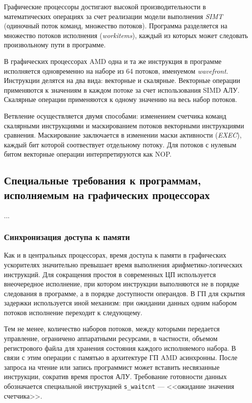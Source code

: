\documentclass[a4paper,14pt]{extarticle}
\begin{document}
Графические процессоры достигают высокой производительности в математических операциях
за счет реализации модели выполнения \textit{SIMT} (одиночный поток команд, множество потоков).
Программа разделяется на множество потоков исполнения (\textit{workitems}),
каждый из которых может следовать произвольному пути в программе.

В графических процессорах AMD одна и та же инструкция в программе исполняется одновременно
на наборе из 64 потоков, именуемом \textit{wavefront}. Инструкции делятся на два вида:
векторные и скалярные. Векторные операции применяются к значениям в каждом потоке
за счет использования SIMD АЛУ. Скалярные операции применяются к одному значению на весь набор
потоков.

Ветвление осуществляется двумя способами: изменением счетчика команд скалярными инструкциями
и маскированием потоков векторными инструкциями сравнения. Маскирование заключается в изменении
маски активности (\textit{EXEC}), каждый бит которой соотвествует отдельному потоку.
Для потоков с нулевым битом векторные операции интерпретируются как NOP.

\subsection{Специальные требования к программам, исполняемым на графических процессорах}

...

\subsubsection{Синхронизация доступа к памяти}

Как и в центральных процессорах, время доступа к памяти в графических ускорителях
значительно превышает время выполнения арифметико-логических инструкций.
Для сокращения простоя в современных ЦП используется внеочередное исполнение, при котором
инструкции выполняются не в порядке следования в программе, а в порядке доступности операндов.
В ГП для скрытия задержки используется иной механизм: при ожидании данных одним набором
потоков исполнение переходит к следующему.

Тем не менее, количество наборов потоков, между которыми передается управление, ограничено
аппаратными ресурсами, в частности, объемом регистрового файла для хранения состояния каждого
исполняемого набора. В связи с этим операции с памятью в архитектуре ГП AMD асинхронны.
После запроса на чтение или запись программист может вставить несвязанные инструкции,
сократив время простоя АЛУ. Требование готовности данных обозначается специальной
инструкцией \texttt{s\_waitcnt} — <<ожидание значения счетчика>>.
\end{document}
